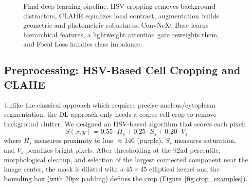 \documentclass[twocolumn,a4paper]{article}
\begin{document}
\begin{figure}[htbp]
{}
\caption{Final deep learning pipeline. HSV cropping removes background distractors, CLAHE equalizes local contrast, augmentation builds geometric and photometric robustness, ConvNeXt-Base learns hierarchical features, a lightweight attention gate reweights them, and Focal Loss handles class imbalance.}
\label{fig:pipeline}
\end{figure}

\subsection{Preprocessing: HSV-Based Cell Cropping and CLAHE}

Unlike the classical approach which requires precise nucleus/cytoplasm segmentation, the DL approach only needs a coarse cell crop to remove background clutter. We designed an HSV-based algorithm that scores each pixel:
\[
S(x,y) = 0.55 \cdot H_s + 0.25 \cdot S_s + 0.20 \cdot V_s
\]
where $H_s$ measures proximity to hue $\approx 140$ (purple), $S_s$ measures saturation, and $V_s$ penalizes bright pixels. After thresholding at the 92nd percentile, morphological cleanup, and selection of the largest connected component near the image center, the mask is dilated with a $45\times45$ elliptical kernel and the bounding box (with 20px padding) defines the crop (Figure~\ref{fig:crop_examples}).
\end{document}
